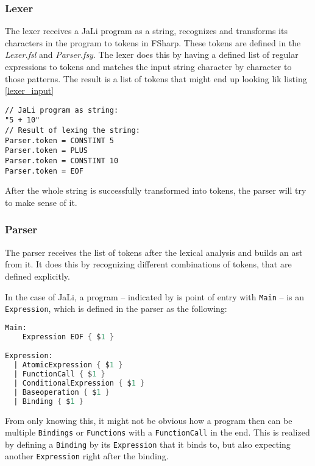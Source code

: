 \subsubsection{Lexer}
The lexer receives a JaLi program as a string, recognizes and transforms its characters in the program to tokens in FSharp. These tokens are defined in the \textit{Lexer.fsl} and \textit{Parser.fsy}. The lexer does this by having a defined list of regular expressions to tokens and matches the input string character by character to those patterns.
The result is a list of tokens that might end up looking lik listing \ref{lexer_input}

\begin{lstlisting}[columns=fullflexible, label={lexer_input}, language=JaLi, caption=Lexer result]
// JaLi program as string:
"5 + 10"
// Result of lexing the string:
Parser.token = CONSTINT 5
Parser.token = PLUS
Parser.token = CONSTINT 10
Parser.token = EOF
\end{lstlisting}

After the whole string is successfully transformed into tokens, the parser will try to make sense of it.

\subsubsection{Parser}
The parser receives the list of tokens after the lexical analysis and builds an \gls{ast} from it. It does this by recognizing different combinations of tokens, that are defined explicitly.

In the case of JaLi, a program -- indicated by is point of entry with \texttt{Main} -- is an \texttt{Expression}, which is defined in the parser as the following:

\begin{lstlisting}[columns=fullflexible, label={parser_expression}, language=FSharp, caption=Program defined by \texttt{Expression}]
Main:
    Expression EOF { $1 }

Expression:
  | AtomicExpression { $1 }
  | FunctionCall { $1 }
  | ConditionalExpression { $1 }
  | Baseoperation { $1 }
  | Binding { $1 }
\end{lstlisting}

From only knowing this, it might not be obvious how a program then can be multiple \texttt{Bindings} or \texttt{Functions} with a \texttt{FunctionCall} in the end. This is realized by defining a \texttt{Binding} by its \texttt{Expression} that it binds to, but also expecting another \texttt{Expression} right after the binding.

